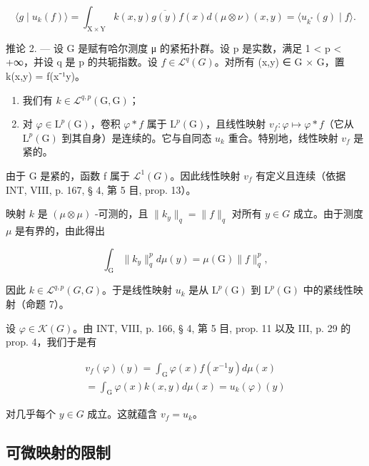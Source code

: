 \[
\langle g \mid u _ {k} (f) \rangle = \int_ {\mathrm{X} \times \mathrm{Y}} k (x, y) \overline {{g (y)}} f (x) d (\mu \otimes \nu) (x, y) = \langle u _ {k ^ {*}} (g) \mid f \rangle .
\]

推论 2. --- 设 G 是赋有哈尔测度 μ 的紧拓扑群。设 p 是实数，满足 1 \textless{} p \textless{} +∞，并设 q 是 p 的共轭指数。设 \(f \in \mathcal{L}^{q}(G)\)。对所有 (x,y) ∈ G × G，置 k(x,y) = f(x⁻¹y)。

\begin{enumerate}
\def\labelenumi{\alph{enumi})}
\item
  我们有 \(k \in \mathcal{L}^{q,p}(\mathrm{G},\mathrm{G})\)；
\item
  对 \(\varphi \in \mathrm{L}^p (\mathrm{G})\)，卷积 \(\varphi *f\) 属于 \(\mathrm{L}^p (\mathrm{G})\)，且线性映射 \(v_{f}\colon \varphi \mapsto \varphi *f\)（它从 \(\mathrm{L}^p (\mathrm{G})\) 到其自身）是连续的。它与自同态 \(u_{k}\) 重合。特别地，线性映射 \(v_{f}\) 是紧的。
\end{enumerate}

由于 G 是紧的，函数 f 属于 \(\mathcal{L}^{1}(G)\)。因此线性映射 \(v_{f}\) 有定义且连续（依据 INT, VIII, p. 167, § 4, 第 5 目, prop. 13）。

映射 \(k\) 是 \((\mu \otimes \mu)\) -可测的，且 \(\| k_y\| _q = \| f\| _q\) 对所有 \(y\in G\) 成立。由于测度 \(\mu\) 是有界的，由此得出

\[
\int_ {\mathrm{G}} \| k _ {y} \| _ {q} ^ {p} d \mu (y) = \mu (\mathrm{G}) \| f \| _ {q} ^ {p},
\]

因此 \(k \in \mathcal{L}^{q,p}(G, G)\)。于是线性映射 \(u_{k}\) 是从 \(\mathrm{L}^{p}(\mathrm{G})\) 到 \(\mathrm{L}^{p}(\mathrm{G})\) 中的紧线性映射（命题 7）。

设 \(\varphi\in\mathcal{K}(G)\)。由 INT, VIII, p. 166, § 4, 第 5 目, prop. 11 以及 III, p. 29 的 prop. 4，我们于是有

\[
\begin{array}{c} v _ {f} (\varphi) (y) = \int_ {\mathrm{G}} \varphi (x) f (x ^ {- 1} y) d \mu (x) \\ = \int_ {\mathrm{G}} \varphi (x) k (x, y) d \mu (x) = u _ {k} (\varphi) (y) \end{array}
\]

对几乎每个 \(y \in G\) 成立。这就蕴含 \(v_{f} = u_{k}\)。

\subsection{可微映射的限制}

